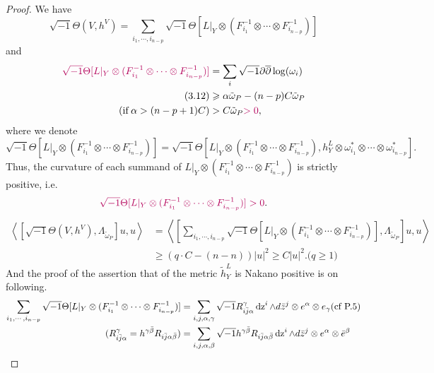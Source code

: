 \documentclass[twoside,openany,12pt]{beautynote}
\begin{document}
\begin{proof}
    We have
    \[ 
        \sqrt{- 1} \Theta (V, h^V)  =  \sum_{i_1, \cdots, i_{n - p}} \sqrt{-
        1} \Theta [L |_Y \otimes  (F_{i_1}^{- 1} \otimes \cdots
        \otimes F_{i_{n - p}}^{- 1})]
    \]
    and
    \begin{align*}
    {\color[HTML]{B4005A}\sqrt{- 1} \Theta [L |_Y \otimes 
    (F_{i_1}^{- 1} \otimes \cdots \otimes F_{i_{n - p}}^{- 1})]} & =  \sum_i
    \sqrt{- 1} \partial \overline{\partial} \log (\omega_i)\\
    (3.12) & \geqslant  \alpha \tilde{\omega}_P - (n - p) C
    \tilde{\omega}_P\\
    (\tmop{if} \alpha > (n - p + 1) C) & >  C\tilde{\omega}_P
    {\color[HTML]{B4005A}> 0} ,
    \end{align*}
where we denote 
    $$\sqrt{- 1} \Theta [L |_Y \otimes 
(F_{i_1}^{- 1} \otimes \cdots \otimes F_{i_{n - p}}^{- 1})]=\sqrt{- 1} \Theta [L |_Y \otimes 
(F_{i_1}^{- 1} \otimes \cdots \otimes F_{i_{n - p}}^{- 1}), h_Y^L\otimes \omega_{i_1}^* \otimes\cdots\otimes\omega_{i_{n-p}}^*].
$$
    Thus, the curvature of each summand of $L |_Y \otimes  (F_{i_1}^{-
    1} \otimes \cdots \otimes F_{i_{n - p}}^{- 1})$ is strictly positive, i.e.
    \[{\color[HTML]{B4005A}\sqrt{- 1} \Theta [L |_Y \otimes (F_{i_1}^{- 1} \otimes \cdots \otimes F_{i_{n - p}}^{- 1})]> 0}.
    \]
    \begin{align*}
        \left\langle \left[ \sqrt{- 1} \Theta (V, h^V), \Lambda_{\widetilde{\omega}_P}\right] u, u \right\rangle & =  \left\langle \left[ \sum_{i_1, \cdots, i_{n - p}}\sqrt{- 1} \Theta [L |_Y \otimes  (F_{i_1}^{- 1} \otimes \cdots\otimes F_{i_{n - p}}^{- 1})], \Lambda_{\widetilde{\omega}_P} \right] u, u\right\rangle\\
        & \geqslant (q\cdot C-(n-n))|u|^2\geqslant C|u|^2. \text{($q\geqslant 1$)}
    \end{align*}
    And the proof of the assertion that of the metric $\widetilde{h}^{L }_Y$ is Nakano
    positive is on following.
    \begin{align*}
        \sum_{i_1, \cdots, i_{n - p}} \sqrt{- 1} \Theta [L |_Y \otimes 
        (F_{i_1}^{- 1} \otimes \cdots \otimes F_{i_{n - p}}^{- 1})] & =  \sum_{i,j, \alpha, \gamma} \sqrt{- 1} R_{i \bar{j} \alpha}^{\gamma} \tmop{dz}^i
        \wedge d \bar{z}^j \otimes e^{\alpha} \otimes e_{\gamma}  (\textrm{cf P.5} )\\
        (R_{i \bar{j} \alpha}^{\gamma} = h^{\gamma \bar{\beta}} R_{i \bar{j} \alpha\bar{\beta}} ) & =  \sum_{i, j, \alpha, \beta} \sqrt{- 1} h^{\gamma
        \bar{\beta}} R_{i \bar{j} \alpha \bar{\beta}}  \tmop{dz}^i \wedge d\bar{z}^j \otimes e^{\alpha} \otimes \bar{e}^{\beta}\\

\end{align*}
\end{proof}
\end{document}
